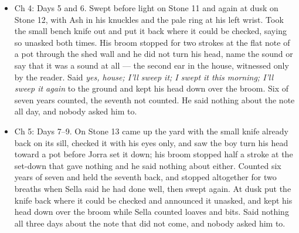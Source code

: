 \documentclass{design/chronicle}
\begin{document}
{\begin{itemize}[leftmargin=1.4em,itemsep=1pt,topsep=3pt,parsep=0pt]
\end{itemize}

\begin{itemize}[leftmargin=1.4em,itemsep=1pt,topsep=3pt,parsep=0pt]

\item Ch 4: Days 5 and 6. Swept before light on Stone 11 and again at dusk on Stone 12, with Ash in his knuckles and the pale ring at his left wrist. Took the small bench knife out and put it back where it could be checked, saying so unasked both times. His broom stopped for two strokes at the flat note of a pot through the shed wall and he did not turn his head, name the sound or say that it was a sound at all --- the second ear in the house, witnessed only by the reader. Said \emph{yes, house; I’ll sweep it; I swept it this morning; I’ll sweep it again} to the ground and kept his head down over the broom. Six of seven years counted, the seventh not counted. He said nothing about the note all day, and nobody asked him to.

\end{itemize}

\begin{itemize}[leftmargin=1.4em,itemsep=1pt,topsep=3pt,parsep=0pt]

\item Ch 5: Days 7--9. On Stone 13 came up the yard with the small knife already back on its sill, checked it with his eyes only, and saw the boy turn his head toward a pot before Jorra set it down; his broom stopped half a stroke at the set-down that gave nothing and he said nothing about either. Counted six years of seven and held the seventh back, and stopped altogether for two breaths when Sella said he had done well, then swept again. At dusk put the knife back where it could be checked and announced it unasked, and kept his head down over the broom while Sella counted loaves and bits. Said nothing all three days about the note that did not come, and nobody asked him to.

\end{itemize}

\begin{itemize}[leftmargin=1.4em,itemsep=1pt,topsep=3pt,parsep=0pt]


\end{itemize}}
\end{document}
